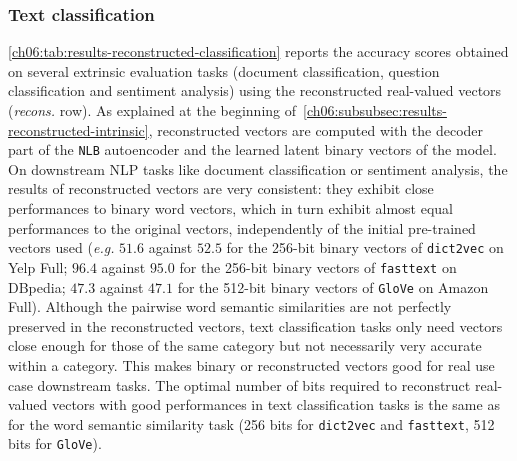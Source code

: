     \subsubsection{Text classification}
      \autoref{ch06:tab:results-reconstructed-classification} reports the
      accuracy scores obtained on several extrinsic evaluation tasks (document
      classification, question classification and sentiment analysis) using the
      reconstructed real-valued vectors (\textit{recons.} row). As explained at
      the beginning of~\autoref{ch06:subsubsec:results-reconstructed-intrinsic},
      reconstructed vectors are computed with the decoder part of the
      \texttt{NLB} autoencoder and the learned latent binary vectors of the
      model. On downstream NLP tasks like document classification or sentiment
      analysis, the results of reconstructed vectors are very consistent: they
      exhibit close performances to binary word vectors, which in turn exhibit
      almost equal performances to the original vectors, independently of the
      initial pre-trained vectors used (\textit{e.g.} $51.6$ against $52.5$ for
      the 256-bit binary vectors of \texttt{dict2vec} on Yelp Full; $96.4$
      against $95.0$ for the 256-bit binary vectors of \texttt{fasttext} on
      DBpedia; $47.3$ against $47.1$ for the 512-bit binary vectors of
      \texttt{GloVe} on Amazon Full). Although the pairwise word semantic
      similarities are not perfectly preserved in the reconstructed vectors,
      text classification tasks only need vectors close enough for those of the
      same category but not necessarily very accurate within a category. This
      makes binary or reconstructed vectors good for real use case
      downstream tasks. The optimal number of bits required to reconstruct
      real-valued vectors with good performances in text classification tasks is
      the same as for the word semantic similarity task (256 bits for
      \texttt{dict2vec} and \texttt{fasttext}, 512 bits for \texttt{GloVe}).

